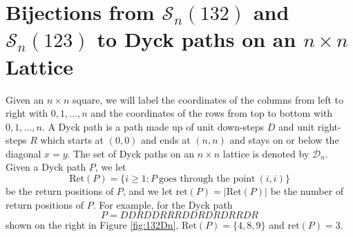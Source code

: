 \documentclass[
final,nomarks
]{dmtcs-episciences}
\newcommand{\fref}[1]{Figure \ref{fig:#1}}
\newcommand{\Sn}[1]{\mathcal{S}_{#1}}
\begin{document}
\section{Bijections from \(\Sn{n}(132)\) and \(\Sn{n}(123)\) to Dyck paths on an \(n\times n\) Lattice}

Given an \begin{math}n\times n\end{math} square, we will label the coordinates of the columns from left to right with \begin{math}0,1, \ldots, n\end{math} 
and the coordinates of the rows from top to bottom with \begin{math}0,1, \ldots, n\end{math}.  A Dyck path is a path 
made up of unit down-steps \begin{math}D\end{math} and unit right-steps \begin{math}R\end{math} which starts at \begin{math}(0,0)\end{math} and 
ends at \begin{math}(n,n)\end{math} and stays on or below the diagonal \begin{math}x =y\end{math}. The set of Dyck paths on an \(n\times n\) lattice is denoted by 
\begin{math}\mathcal{D}_n\end{math}.
Given a Dyck path \begin{math}P\end{math}, 
we let 
\begin{displaymath}
	\mathrm{Ret}(P) = \{i \geq 1: P \ \mbox{goes through the point} \ (i,i)\}
\end{displaymath}
be the return positions of \begin{math}P\end{math}, and we let \begin{math}\mathrm{ret}(P) = |\mathrm{Ret}(P)|\end{math} be the number of return positions of \begin{math}P\end{math}.  For example, for the Dyck path 
\begin{displaymath}
P =DDRDDRRRDDRDRDRRDR
\end{displaymath}
shown on the right in  \fref{132Dn}, 
\begin{math}\mathrm{Ret}(P) = \{4,8,9\}\end{math} and \begin{math}\mathrm{ret}(P) =3\end{math}. 
\end{document}
